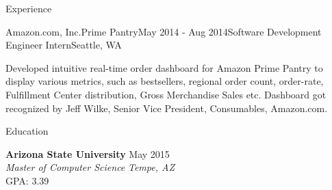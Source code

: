\documentclass{resume} %
\begin{document}
\begin{rSection}{Experience}
	\begin{rSubsection}{Amazon.com, Inc.}{Prime Pantry}{May 2014 - Aug 2014}{Software Development Engineer Intern}{Seattle, WA}
		\item Developed intuitive real-time order dashboard for Amazon Prime Pantry to display various metrics, such as bestsellers, regional order count, order-rate, Fulfillment Center distribution, Gross Merchandise Sales etc. Dashboard got recognized by Jeff Wilke, Senior Vice President, Consumables, Amazon.com.
	\end{rSubsection}
	
\end{rSection}



\begin{rSection}{Education}

{\bf Arizona State University} \hfill {May 2015} \\ 
{\em Master of Computer Science} \hfill {\em Tempe, AZ} \\
GPA: 3.39

\end{rSection}
\end{document}
